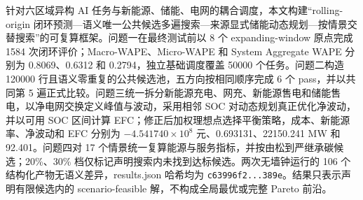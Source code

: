针对六区域异构 AI 任务与新能源、储能、电网的耦合调度，本文构建“rolling-origin 闭环预测—语义唯一公共候选多遍搜索—来源显式储能动态规划—按情景交替搜索”的可复算框架。问题一在最终测试前以 8 个 expanding-window 原点完成 1584 次闭环评价；Macro-WAPE、Micro-WAPE 和 System Aggregate WAPE 分别为 0.8069、0.6312 和 0.2794，独立基础调度覆盖 50000 个任务。问题二构造 120000 行且语义零重复的公共候选池，五方向按相同顺序完成 6 个 pass，并以共同第 5 遍正式比较。问题三统一拆分新能源充电、网充、新能源售电和储能售电，以净电网交换定义峰值与波动，采用相邻 SOC 对动态规划真正优化净波动，并以可用 SOC 区间计算 EFC；修正后加权理想点选择平衡策略，成本、新能源率、净波动和 EFC 分别为 $-4.541740\times10^8$ 元、0.693131、22150.241 MW 和 92.401。问题四对 17 个情景统一复算能源与服务指标，并按由松到严继承碳候选；20\%、30\% 档仅标记声明搜索内未找到达标候选。两次无墙钟运行的 106 个结构化产物无语义差异，results.json 哈希均为 \texttt{c63996f2...389e}。结果只表示声明有限候选内的 scenario-feasible 解，不构成全局最优或完整 Pareto 前沿。